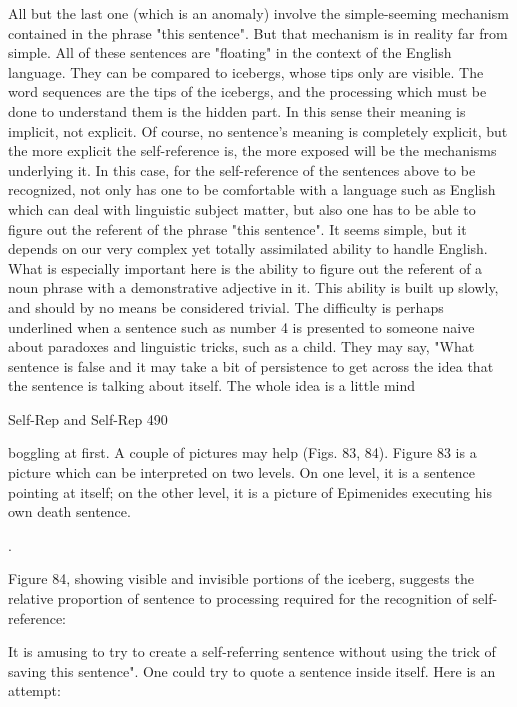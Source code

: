 {All but the last one (which is an anomaly) involve the simple-seeming mechanism contained
in the phrase "this sentence". But that mechanism is in reality far from simple. All of these
sentences are "floating" in the context of the English language. They can be compared to
icebergs, whose tips only are visible. The word sequences are the tips of the icebergs, and the
processing which must be done to understand them is the hidden part. In this sense their
meaning is implicit, not explicit. Of course, no sentence's meaning is completely explicit, but
the more explicit the self-reference is, the more exposed will be the mechanisms underlying
it. In this case, for the self-reference of the sentences above to be recognized, not only has
one to be comfortable with a language such as English which can deal with linguistic subject
matter, but also one has to be able to figure out the referent of the phrase "this sentence". It
seems simple, but it depends on our very complex yet totally assimilated ability to handle
English. What is especially important here is the ability to figure out the referent of a noun
phrase with a demonstrative adjective in it. This ability is built up slowly, and should by no
means be considered trivial. The difficulty is perhaps underlined when a sentence such as
number 4 is presented to someone naive about paradoxes and linguistic tricks, such as a
child. They may say, "What sentence is false and it may take a bit of persistence to get across
the idea that the sentence is talking about itself. The whole idea is a little mind




Self-Rep and Self-Rep                                                                       490

boggling at first. A couple of pictures may help (Figs. 83, 84). Figure 83 is a picture which
can be interpreted on two levels. On one level, it is a sentence pointing at itself; on the other
level, it is a picture of Epimenides executing his own death sentence.




.

  Figure 84, showing visible and invisible portions of the iceberg, suggests the relative
proportion of sentence to processing required for the recognition of self-reference:




        It is amusing to try to create a self-referring sentence without using the trick of saving
this sentence". One could try to quote a sentence inside itself. Here is an attempt:

}
